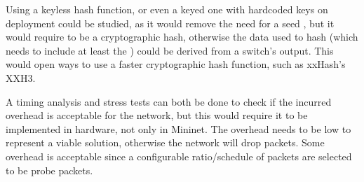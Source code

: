 Using a keyless hash function, or even a keyed one with hardcoded keys on deployment could be studied, as it would remove the need for a seed \timestamp, but it would require to be a cryptographic hash, otherwise the data used to hash (which needs to include at least the \nodeid) could be derived from a switch's output. This would open ways to use a faster cryptographic hash function, such as xxHash's XXH3.

A timing analysis and stress tests can both be done to check if the incurred overhead is acceptable for the network, but this would require it to be implemented in hardware, not only in Mininet. The overhead needs to be low 
to represent a viable solution, otherwise the network will drop packets. Some overhead is acceptable since a configurable ratio/schedule of \polka packets are selected to be probe packets.

